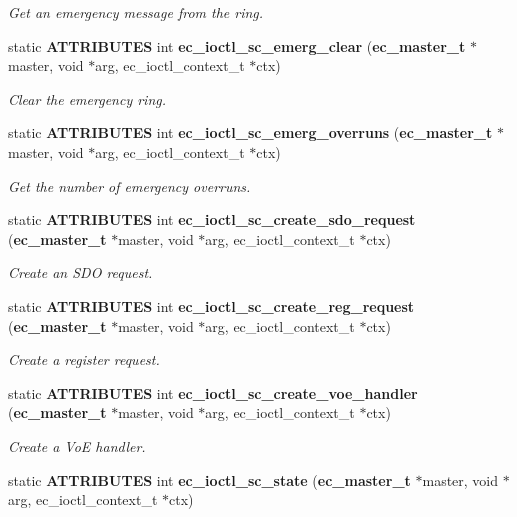 \begin{DoxyCompactItemize}
\begin{DoxyCompactList}\small\item\em Get an emergency message from the ring. \end{DoxyCompactList}\item 
static {\bf A\-T\-T\-R\-I\-B\-U\-T\-E\-S} int {\bf ec\-\_\-ioctl\-\_\-sc\-\_\-emerg\-\_\-clear} ({\bf ec\-\_\-master\-\_\-t} $\ast$master, void $\ast$arg, ec\-\_\-ioctl\-\_\-context\-\_\-t $\ast$ctx)
\begin{DoxyCompactList}\small\item\em Clear the emergency ring. \end{DoxyCompactList}\item 
static {\bf A\-T\-T\-R\-I\-B\-U\-T\-E\-S} int {\bf ec\-\_\-ioctl\-\_\-sc\-\_\-emerg\-\_\-overruns} ({\bf ec\-\_\-master\-\_\-t} $\ast$master, void $\ast$arg, ec\-\_\-ioctl\-\_\-context\-\_\-t $\ast$ctx)
\begin{DoxyCompactList}\small\item\em Get the number of emergency overruns. \end{DoxyCompactList}\item 
static {\bf A\-T\-T\-R\-I\-B\-U\-T\-E\-S} int {\bf ec\-\_\-ioctl\-\_\-sc\-\_\-create\-\_\-sdo\-\_\-request} ({\bf ec\-\_\-master\-\_\-t} $\ast$master, void $\ast$arg, ec\-\_\-ioctl\-\_\-context\-\_\-t $\ast$ctx)
\begin{DoxyCompactList}\small\item\em Create an S\-D\-O request. \end{DoxyCompactList}\item 
static {\bf A\-T\-T\-R\-I\-B\-U\-T\-E\-S} int {\bf ec\-\_\-ioctl\-\_\-sc\-\_\-create\-\_\-reg\-\_\-request} ({\bf ec\-\_\-master\-\_\-t} $\ast$master, void $\ast$arg, ec\-\_\-ioctl\-\_\-context\-\_\-t $\ast$ctx)
\begin{DoxyCompactList}\small\item\em Create a register request. \end{DoxyCompactList}\item 
static {\bf A\-T\-T\-R\-I\-B\-U\-T\-E\-S} int {\bf ec\-\_\-ioctl\-\_\-sc\-\_\-create\-\_\-voe\-\_\-handler} ({\bf ec\-\_\-master\-\_\-t} $\ast$master, void $\ast$arg, ec\-\_\-ioctl\-\_\-context\-\_\-t $\ast$ctx)
\begin{DoxyCompactList}\small\item\em Create a Vo\-E handler. \end{DoxyCompactList}\item 
static {\bf A\-T\-T\-R\-I\-B\-U\-T\-E\-S} int {\bf ec\-\_\-ioctl\-\_\-sc\-\_\-state} ({\bf ec\-\_\-master\-\_\-t} $\ast$master, void $\ast$arg, ec\-\_\-ioctl\-\_\-context\-\_\-t $\ast$ctx)

\end{DoxyCompactItemize}
